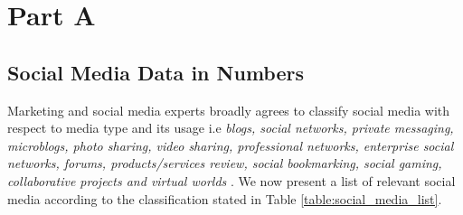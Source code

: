 \section{Part A}
\label{part_a}
\subsection*{Social Media Data in Numbers}
Marketing and social media experts broadly agrees to classify social media with respect to media type and its usage i.e {\em blogs, social networks, private messaging, microblogs,  photo sharing,  video sharing, professional networks,  enterprise social networks, forums, products/services review, social bookmarking, social gaming, collaborative projects  and virtual worlds} \cite{aichner2015measuring}. We now present a list of relevant social media according to the classification stated in Table \ref{table:social_media_list}.

